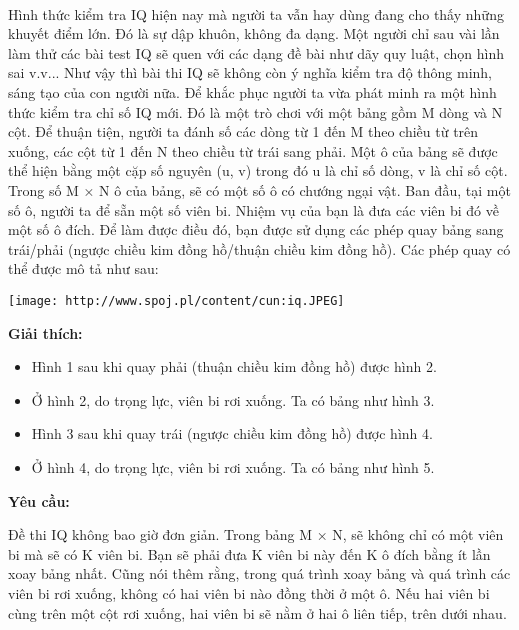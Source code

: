  

Hình thức kiểm tra IQ hiện nay mà người ta vẫn hay dùng đang cho thấy những khuyết điểm lớn. Đó là sự dập khuôn, không đa dạng. Một người chỉ sau vài lần làm thử các bài test IQ sẽ quen với các dạng đề bài như dãy quy luật, chọn hình sai v.v... Như vậy thì bài thi IQ sẽ không còn ý nghĩa kiểm tra độ thông minh, sáng tạo của con người nữa. Để khắc phục người ta vừa phát minh ra một hình thức kiểm tra chỉ số IQ mới. Đó là một trò chơi với một bảng gồm M dòng và N cột. Để thuận tiện, người ta đánh số các dòng từ 1 đến M theo chiều từ trên xuống, các cột từ 1 đến N theo chiều từ trái sang phải. Một ô của bảng sẽ được thể hiện bằng một cặp số nguyên (u, v) trong đó u là chỉ số dòng, v là chỉ số cột. Trong số M × N ô của bảng, sẽ có một số ô có chướng ngại vật. Ban đầu, tại một số ô, người ta để sẵn một số viên bi. Nhiệm vụ của bạn là đưa các viên bi đó về một số ô đích. Để làm được điều đó, bạn được sử dụng các phép quay bảng sang trái/phải (ngược chiều kim đồng hồ/thuận chiều kim đồng hồ). Các phép quay có thể được mô tả như sau:


\texttt{[image: http://www.spoj.pl/content/cun:iq.JPEG]}

\textbf{Giải thích:}
\begin{itemize}
	\item Hình 1 sau khi quay phải (thuận chiều kim đồng hồ) được hình 2.
	\item Ở hình 2, do trọng lực, viên bi rơi xuống. Ta có bảng như hình 3.
	\item Hình 3 sau khi quay trái (ngược chiều kim đồng hồ) được hình 4.
	\item Ở hình 4, do trọng lực, viên bi rơi xuống. Ta có bảng như hình 5.
\end{itemize}

\textbf{Yêu cầu:}

Đề thi IQ không bao giờ đơn giản. Trong bảng M × N, sẽ không chỉ có một viên bi mà sẽ có K viên bi. Bạn sẽ phải đưa K viên bi này đến K ô đích bằng ít lần xoay bảng nhất. Cũng nói thêm rằng, trong quá trình xoay bảng và quá trình các viên bi rơi xuống, không có hai viên bi nào đồng thời ở một ô. Nếu hai viên bi cùng trên một cột rơi xuống, hai viên bi sẽ nằm ở hai ô liên tiếp, trên dưới nhau.